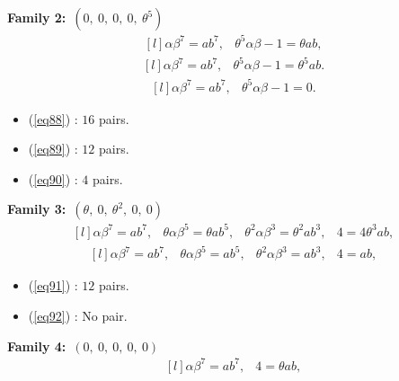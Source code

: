 \documentclass[12pt,a4wide, reqno]{amsart}
\theoremstyle{definition}
\theoremstyle{remark}
\numberwithin{equation}{section}
\begin{document}
   \textbf{Family 2:}~$(0,~0,~0,~0,~\theta^5)$ 
\begin{equation}\label{eq88}
    \begin{matrix*}[l]
         \alpha \beta ^7=ab^7, & \theta^5\alpha\beta-1=\theta ab,
    \end{matrix*}
\end{equation}
\begin{equation}\label{eq89}
    \begin{matrix*}[l]
         \alpha \beta ^7=ab^7, & \theta^5\alpha\beta-1=\theta^5ab.
    \end{matrix*}
\end{equation}
\begin{equation}\label{eq90}
    \begin{matrix*}[l]
         \alpha \beta ^7=ab^7, & \theta^5\alpha\beta-1=0.
    \end{matrix*}
\end{equation}
\begin{itemize}
    \item 
    (\ref{eq88}) : $16$ pairs.
    \item 
    (\ref{eq89}) : $12$ pairs.
    \item 
    (\ref{eq90}) : $4$ pairs.
    \end{itemize}
\textbf{Family 3:}~$(\theta,~0,~\theta^2,~0,~0)$ 
\begin{equation}\label{eq91}
    \begin{matrix*}[l]
         \alpha \beta ^7=ab^7, & \theta\alpha\beta^5=\theta ab^5, & \theta^2\alpha\beta^3=\theta^2ab^3, & 4=4\theta^3ab,
    \end{matrix*}
\end{equation}
\begin{equation}\label{eq92}
    \begin{matrix*}[l]
         \alpha \beta ^7=ab^7, & \theta \alpha\beta^5=ab^5, & \theta^2\alpha\beta^3=ab^3, & 4=ab,
    \end{matrix*}
\end{equation}
\begin{itemize}
    \item 
    (\ref{eq91}) : $12$ pairs.
    \item 
    (\ref{eq92}) : No pair.
    \end{itemize}
    \textbf{Family 4:}~$(0,~0,~0,~0,~0)$ 
\begin{equation}\label{eq93}
    \begin{matrix*}[l]
         \alpha \beta ^7=ab^7,  & 4=\theta ab,
    \end{matrix*}
\end{equation}
\end{document}
